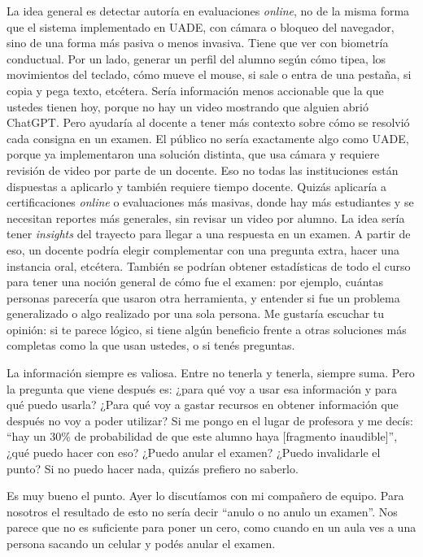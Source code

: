 \begin{description}[leftmargin=0cm, labelsep=0.5cm, style=nextline]
La idea general es detectar autoría en evaluaciones \textit{online}, no de la misma forma que el sistema implementado en UADE, con cámara o bloqueo del navegador, sino de una forma más pasiva o menos invasiva.
Tiene que ver con biometría conductual. Por un lado, generar un perfil del alumno según cómo tipea, los movimientos del teclado, cómo mueve el mouse, si sale o entra de una pestaña, si copia y pega texto, etcétera.
Sería información menos accionable que la que ustedes tienen hoy, porque no hay un video mostrando que alguien abrió ChatGPT. Pero ayudaría al docente a tener más contexto sobre cómo se resolvió cada consigna en un examen.
El público no sería exactamente algo como UADE, porque ya implementaron una solución distinta, que usa cámara y requiere revisión de video por parte de un docente. Eso no todas las instituciones están dispuestas a aplicarlo y también requiere tiempo docente.
Quizás aplicaría a certificaciones \textit{online} o evaluaciones más masivas, donde hay más estudiantes y se necesitan reportes más generales, sin revisar un video por alumno. La idea sería tener \textit{insights} del trayecto para llegar a una respuesta en un examen. A partir de eso, un docente podría elegir complementar con una pregunta extra, hacer una instancia oral, etcétera.
También se podrían obtener estadísticas de todo el curso para tener una noción general de cómo fue el examen: por ejemplo, cuántas personas parecería que usaron otra herramienta, y entender si fue un problema generalizado o algo realizado por una sola persona.
Me gustaría escuchar tu opinión: si te parece lógico, si tiene algún beneficio frente a otras soluciones más completas como la que usan ustedes, o si tenés preguntas.
\item[\textbf{Entrevistada:}] La información siempre es valiosa. Entre no tenerla y tenerla, siempre suma. Pero la pregunta que viene después es: ¿para qué voy a usar esa información y para qué puedo usarla? ¿Para qué voy a gastar recursos en obtener información que después no voy a poder utilizar?
Si me pongo en el lugar de profesora y me decís: ``hay un 30\% de probabilidad de que este alumno haya [fragmento inaudible]'', ¿qué puedo hacer con eso? ¿Puedo anular el examen? ¿Puedo invalidarle el punto? Si no puedo hacer nada, quizás prefiero no saberlo.
\item[\textbf{Entrevistadores:}] Es muy bueno el punto. Ayer lo discutíamos con mi compañero de equipo. Para nosotros el resultado de esto no sería decir ``anulo o no anulo un examen''. Nos parece que no es suficiente para poner un cero, como cuando en un aula ves a una persona sacando un celular y podés anular el examen.

\end{description}
